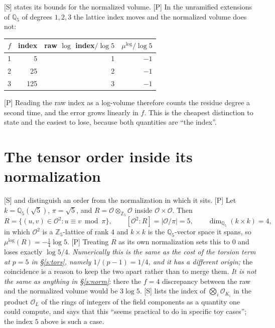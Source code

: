 \documentclass[11pt]{article}
\theoremstyle{plain}
\theoremstyle{definition}
\newcommand{\mulog}{\mu^{\log}}
\begin{document}
\textup{[S]} \cite[Prop.~1.4(i),(ii)]{IUT4} states its bounds for the normalized volume.
\textup{[P]} In the unramified extensions of $\mathbb{Q}_5$ of degrees $1,2,3$ the
lattice index moves and the normalized volume does not:

\begin{center}
\begin{tabular}{rrrr}
\toprule
$f$ & index & raw $\log$ index$/\log5$ & $\mulog/\log5$\\
\midrule
1 & 5 & 1 & $-1$\\
2 & 25 & 2 & $-1$\\
3 & 125 & 3 & $-1$\\
\bottomrule
\end{tabular}
\end{center}

\textup{[P]} Reading the raw index as a log-volume therefore counts the residue degree
a second time, and the error grows linearly in $f$.  This is the cheapest distinction to
state and the easiest to lose, because both quantities are ``the index''.

\section{The tensor order inside its normalization}\label{s:tens}

\textup{[S]} \cite[Prop.~1.1]{IUT4} and \cite[Prop.~1.4(iii)]{IUT4} distinguish an order
from the normalization in which it sits.  \textup{[P]} Let $k=\mathbb{Q}_5(\sqrt5)$,
$\pi=\sqrt5$, and $R=\mathcal{O}\otimes_{\mathbb{Z}_5}\mathcal{O}$ inside
$\mathcal{O}\times\mathcal{O}$.  Then
\[
  R=\{(u,v)\in\mathcal{O}^{2}: u\equiv v \bmod \pi\},\qquad
  [\mathcal{O}^{2}:R]=|\mathcal{O}/\pi|=5,\qquad
  \dim_{\mathbb{Q}_5}(k\times k)=4,
\]
in which $\mathcal{O}^{2}$ is a $\mathbb{Z}_5$-lattice of rank $4$ and $k\times k$ is
the $\mathbb{Q}_5$-vector space it spans,
so $\mulog(R)=-\tfrac14\log5$.  \textup{[P]} Treating $R$ as its own normalization sets
this to $0$ and loses exactly $\log5/4$.  \emph{Numerically this is the same as the cost of
the torsion term at $p=5$ in \S\ref{s:tors}, namely $1/(p-1)=1/4$, and it has a
different origin;} the coincidence is a reason to keep the two apart rather than to
merge them.  \emph{It is not the same as anything in \S\ref{s:norm}}: there the $f=4$
discrepancy between the raw and the normalized volume would be $3\log5$.
\textup{[S]} \cite[Rem.~6.2.1(2)]{DHPS} lists the index of
$\bigotimes_i\mathcal{O}_{K_i}$ in the product $\mathcal{O}_L$ of the rings of integers
of the field components as a quantity one could compute, and says that this ``seems
practical to do in specific toy cases''; the index $5$ above is such a case.
\end{document}

